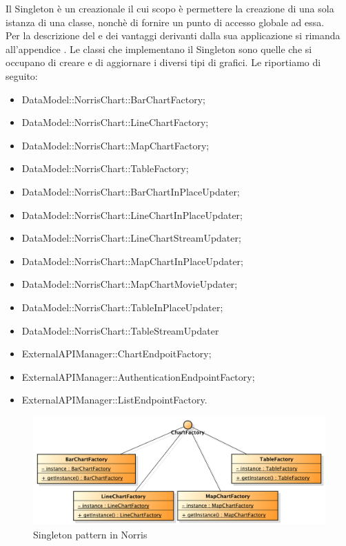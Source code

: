 			Il Singleton è un  creazionale il cui scopo è permettere la creazione di una sola istanza di una classe, nonchè di fornire un punto di accesso globale ad essa.\\
			Per la descrizione del  e dei vantaggi derivanti dalla sua applicazione si rimanda all'appendice .
				Le classi che implementano il Singleton sono quelle che si occupano di creare e di aggiornare i diversi tipi di grafici. Le riportiamo di seguito:
				\begin{itemize}
					\item DataModel::NorrisChart::BarChartFactory;
					\item DataModel::NorrisChart::LineChartFactory;
					\item DataModel::NorrisChart::MapChartFactory;
					\item DataModel::NorrisChart::TableFactory;
					\item DataModel::NorrisChart::BarChartInPlaceUpdater;
					\item DataModel::NorrisChart::LineChartInPlaceUpdater;
					\item DataModel::NorrisChart::LineChartStreamUpdater;
					\item DataModel::NorrisChart::MapChartInPlaceUpdater;
					\item DataModel::NorrisChart::MapChartMovieUpdater;
					\item DataModel::NorrisChart::TableInPlaceUpdater;
					\item DataModel::NorrisChart::TableStreamUpdater
					\item ExternalAPIManager::ChartEndpoitFactory;
					\item ExternalAPIManager::AuthenticationEndpointFactory;
					\item ExternalAPIManager::ListEndpointFactory.
				\end{itemize}
				\begin{figure}[H]\centering
	        		\includegraphics[width=\textwidth]{SpecificaTecnica/Pics/DesignPatternNorris/Singleton2}
	        		\caption{Singleton pattern in Norris}
	    		\end{figure}
